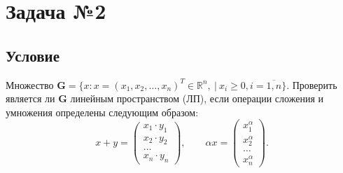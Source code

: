 \documentclass[12pt, a4paper]{article}
\begin{document}
	\newpage
	\section{Задача №2}
	
		\subsection*{Условие}
			Множество 
			$
			\mathbf{G} = 
			\{ x: x = (x_1, x_2, \dots, x_n)^T \in \mathbb{R}^n,\ |\ x_i \geqslant 0, i=\overline{1,n} \}$. Проверить является ли $\mathbf{G}$ линейным пространством (ЛП), если операции сложения и умножения определены следующим образом: 
			\begin{equation}
				\label{sum_mul}
				x + y = 
				\left(
				\begin{matrix}
					x_1 \cdot y_1 \\
					x_2 \cdot y_2 \\
					\dots \\
					x_n \cdot y_n
				\end{matrix}
				\right), 
				\qquad
				\alpha x = 
				\left(
				\begin{matrix}
					x_1^\alpha \\
					x_2^\alpha \\
					\dots \\
					x_n^\alpha
				\end{matrix}
				\right).
			\end{equation}
			
		
\end{document}
